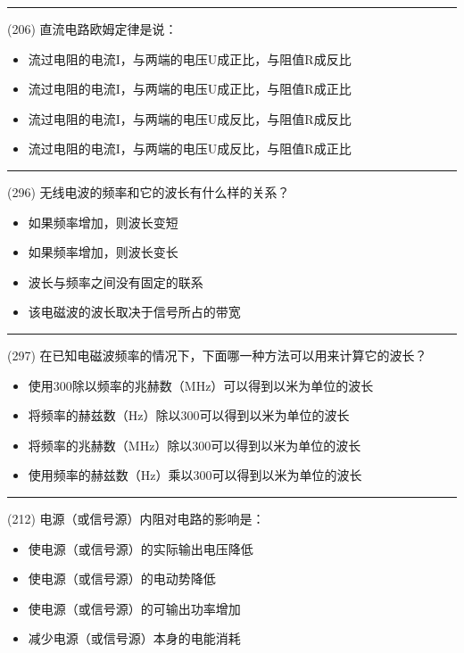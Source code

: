 \documentclass[twocolumn,hyperref,UTF8]{ctexart}  %
\begin{document}
\noindent\rule{0.5\textwidth}{1pt}
\heiti (206) 直流电路欧姆定律是说： \songti {\color{gray} [LK0440] }
\begin{itemize}
	\item  流过电阻的电流I，与两端的电压U成正比，与阻值R成反比
	\item  流过电阻的电流I，与两端的电压U成正比，与阻值R成正比
	\item  流过电阻的电流I，与两端的电压U成反比，与阻值R成反比
	\item  流过电阻的电流I，与两端的电压U成反比，与阻值R成正比
\end{itemize}


\noindent\rule{0.5\textwidth}{1pt}
\heiti (296) 无线电波的频率和它的波长有什么样的关系？ \songti {\color{gray} [LK1110] }
\begin{itemize}
	\item  如果频率增加，则波长变短
	\item  如果频率增加，则波长变长
	\item  波长与频率之间没有固定的联系
	\item  该电磁波的波长取决于信号所占的带宽
\end{itemize}


\noindent\rule{0.5\textwidth}{1pt}
\heiti (297) 在已知电磁波频率的情况下，下面哪一种方法可以用来计算它的波长？ \songti {\color{gray} [LK1111] }
\begin{itemize}
	\item  使用300除以频率的兆赫数（MHz）可以得到以米为单位的波长
	\item  将频率的赫兹数（Hz）除以300可以得到以米为单位的波长
	\item  将频率的兆赫数（MHz）除以300可以得到以米为单位的波长
	\item  使用频率的赫兹数（Hz）乘以300可以得到以米为单位的波长
\end{itemize}


\noindent\rule{0.5\textwidth}{1pt}
\heiti (212) 电源（或信号源）内阻对电路的影响是： \songti {\color{gray} [LK0537] }
\begin{itemize}
	\item  使电源（或信号源）的实际输出电压降低
	\item  使电源（或信号源）的电动势降低
	\item  使电源（或信号源）的可输出功率增加
	\item  减少电源（或信号源）本身的电能消耗
\end{itemize}



\clearpage
\end{document}
